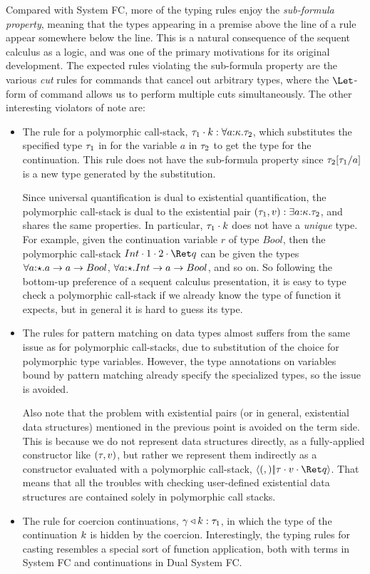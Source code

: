 \documentclass{article}
\begin{document}
Compared with System FC, more of the typing rules enjoy the
\emph{sub-formula property}, meaning that the types appearing in a premise above
the line of a rule appear somewhere below the line.  This is a natural
consequence of the sequent calculus as a logic, and was one of the primary
motivations for its original development.  The expected rules violating the
sub-formula property are the various \emph{cut} rules for commands that cancel
out arbitrary types, where the $\Let$-form of command allows us to perform
multiple cuts simultaneously.  The other interesting violators of note are:
\begin{itemize}
\item The rule for a polymorphic call-stack,
  $\app{\ty_1}{\ko} : \forall\ann{a}{\ki}.\ty_2$, which substitutes the
  specified type $\ty_1$ in for the variable $a$ in $\ty_2$ to get the type for
  the continuation.  This rule does not have the sub-formula property since
  $\ty_2\subst{a}{\ty_1}$ is a new type generated by the substitution.

  Since universal quantification is dual to existential quantification, the
  polymorphic call-stack is dual to the existential pair
  $(\tau_1,\tm) : \exists\ann{a}{\ki}.\tau_2$, and shares the same properties.
  In particular, $\app{\tau_1}{\ko}$ does not have a \emph{unique} type.  For
  example, given the continuation variable $r$ of type $Bool$, then the
  polymorphic call-stack $\app{Int}{\app{1}{\app{2}{\ret q}}}$ can be given the
  types $\forall \ann{a}{\star}. a \to a \to Bool$,
  $\forall \ann{a}{\star}. Int \to a \to Bool$, and so on.  So following the
  bottom-up preference of a sequent calculus presentation, it is easy to type
  check a polymorphic call-stack if we already know the type of function it
  expects, but in general it is hard to guess its type.

\item The rules for pattern matching on data types almost suffers from the same
  issue as for polymorphic call-stacks, due to substitution of the choice for
  polymorphic type variables.  However, the type annotations on variables bound
  by pattern matching already specify the specialized types, so the issue is
  avoided.

  Also note that the problem with existential pairs (or in general, existential
  data structures) mentioned in the previous point is avoided on the term side.
  This is because we do not represent data structures directly, as a
  fully-applied constructor like $(\ty, \tm)$, but rather we represent them
  indirectly as a constructor evaluated with a polymorphic call-stack,
  $\cut{(,)}{\app{\ty}{\app{\tm}{\ret q}}}$.  That means that all the troubles
  with checking user-defined existential data structures are contained solely in
  polymorphic call stacks.

\item The rule for coercion continuations, $\koerce{\cn}{\ko} : \ty_1$, in which
  the type of the continuation $\ko$ is hidden by the coercion.  Interestingly,
  the typing rules for casting resembles a special sort of function application,
  both with terms in System FC and continuations in Dual System FC.
\end{itemize}
\end{document}
